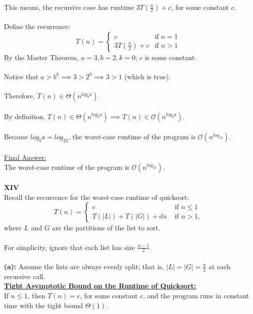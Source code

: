 \documentclass[12pt]{article}
\begin{document}
\\
This means, the recursive case has runtime $3T(\frac{n}{2}) + c$, for some constant $c$. \\
\\
Define the recurrence:
\[
    T(n) =
    \begin{cases}
        c & \text{if } n = 1 \\
        3T(\frac{n}{2}) + c & \text{if } n > 1
    \end{cases}
\]
By the Master Theorem, $a = 3, b = 2, k = 0$; $c$ is some constant. \\
\\
Notice that $a > b^k \implies 3 > 2^0 \implies 3 > 1$ (which is true). \\
\\
Therefore, $T(n) \in \Theta (n^{log_ba})$. \\
\\
By definition, $T(n) \in \Theta (n^{log_ba}) \implies T(n) \in \mathcal{O} (n^{log_ba})$. \\
\\
Because $log_ba = log_23$, the worst-case runtime of the program is $\mathcal{O} (n^{log_23})$. \\
\\
\underline{Final Answer:} \\
The worst-case runtime of the program is $\mathcal{O} (n^{log_23})$. \\
\\
\textbf{XIV} \\
Recall the recurrence for the worst-case runtime of quicksort:
\[ T(n) =
\begin{cases}
    c &\text{ if } n \leq 1 \\
    T(|L|) + T(|G|) + dn &\text{ if } n > 1 \text{,}
\end{cases}
\] where $L$ and $G$ are the partitions of the list to sort. \\
\\
For simplicity, ignore that each list has size \(\frac{n-1}{2}\). \\
\\
\textbf{(a):} Assume the lists are always evenly split; that is, \(|L| = |G| = \frac{n}{2}\) at each recursive call. \\
\textbf{\underline{Tight Asymptotic Bound on the Runtime of Quicksort:}} \\
If $n \leq 1$, then $T(n) = c$, for some constant $c$, and the program runs in constant time with the tight bound $\Theta (1)$. \\
\end{document}
